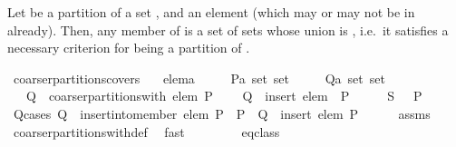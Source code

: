 \begin{isabellebody}
\isanewline
{}\isamarkupfalse%
%
\endisatagproof
{\isafoldproof}%
%
\isadelimproof
%
\endisadelimproof
%
\begin{isamarkuptext}%
Let  be a partition of a set , and  an element (which may or may not be
  in  already).  Then, any member of  is a set of sets
  whose union is , i.e.\ it satisfies a necessary criterion for being a partition of .%
\end{isamarkuptext}%
\isamarkuptrue%
\isamarkupfalse%
\ coarser{\isacharunderscore}partitions{\isacharunderscore}covers{\isacharcolon}\isanewline
\ \ \ elem{\isacharcolon}{\isacharcolon}{\isacharprime}a\isanewline
\ \ \ \ \ P{\isacharcolon}{\isacharcolon}{\isachardoublequoteopen}{\isacharprime}a\ set\ set{\isachardoublequoteclose}\isanewline
\ \ \ \ \ Q{\isacharcolon}{\isacharcolon}{\isachardoublequoteopen}{\isacharprime}a\ set\ set{\isachardoublequoteclose}\isanewline
\ \ \ {\isachardoublequoteopen}Q\ {\isasymin}\ coarser{\isacharunderscore}partitions{\isacharunderscore}with\ elem\ P{\isachardoublequoteclose}\isanewline
\ \ \ {\isachardoublequoteopen}{\isasymUnion}\ Q\ {\isacharequal}\ insert\ elem\ {\isacharparenleft}{\isasymUnion}\ P{\isacharparenright}{\isachardoublequoteclose}\isanewline
%
\isadelimproof
%
\endisadelimproof
%
\isatagproof
{}\isamarkupfalse%
\ {\isacharminus}\isanewline
\ \ \isamarkupfalse%
\ {\isacharquery}S\ {\isacharequal}\ {\isachardoublequoteopen}{\isasymUnion}\ P{\isachardoublequoteclose}\isanewline
\ \ \isamarkupfalse%
\ Q{\isacharunderscore}cases{\isacharcolon}\ {\isachardoublequoteopen}Q\ {\isasymin}\ {\isacharparenleft}insert{\isacharunderscore}into{\isacharunderscore}member\ elem\ P{\isacharparenright}\ {\isacharbackquote}\ P\ {\isasymor}\ Q\ {\isacharequal}\ insert\ {\isacharbraceleft}elem{\isacharbraceright}\ P{\isachardoublequoteclose}\isanewline
\ \ \ \ \isamarkupfalse%
\ assms\ \isamarkupfalse%
\ coarser{\isacharunderscore}partitions{\isacharunderscore}with{\isacharunderscore}def\ \isamarkupfalse%
\ fast\isanewline
\ \ \isacommand{{\isacharbraceleft}}\isamarkupfalse%
\isanewline
\ \ \ \ \isamarkupfalse%
\ eq{\isacharunderscore}class\ \isamarkupfalse%

\end{isabellebody}
